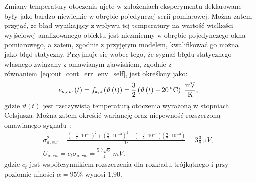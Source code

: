 Zmiany temperatury otoczenia ujęte w założeniach eksperymentu deklarowane były jako bardzo niewielkie w obrębie pojedynczej serii pomiarowej. Można zatem przyjąć, że błąd wynikający z wpływu tej temperatury na wartość wielkości wyjściowej analizowanego obiektu jest niezmienny w obrębie pojedynczego okna pomiarowego, a zatem, zgodnie z przyjętym modelem, kwalifikować go można jako błąd statyczny. Przyjmuje się wobec tego, że sygnał błędu statycznego własnego związany z omawianym zjawiskiem, zgodnie z równaniem~\eqref{eq:out_cont_err_env_self}, jest określony jako:
\begin{equation}
e_{a,sw} \emb{t} = f_{a,z} \left( \vartheta \emb{t} \right) = \frac{3}{2} \left( \vartheta \emb{t} - \qty{20}{\degreeCelsius} \right)~\unit{\frac{mV}{K}} \label{eq:sym_parta_stat_err},
\end{equation}
gdzie $\vartheta(t)$ jest rzeczywistą temperaturą otoczenia wyrażoną w stopniach Celsjusza. Można zatem określić wariancję oraz niepewność rozszerzoną omawianego sygnału~\cite{jcgm_guide}:
\begin{gather}
\sigma_{a,sw}^{2} = \frac{\left( -\frac{9}{2} \cdot 10^{-3} \right)^{2} + \left( \frac{9}{2} \cdot 10^{-3} \right)^{2} - \left( -\frac{9}{2} \cdot 10^{-3} \right) \left( \frac{9}{2} \cdot 10^{-3} \right)}{18} = 3 \frac{3}{8}~\unit{\micro V} \label{eq:sym_parta_stat_var}, \\
U_{a,sw} = c_{t} \sigma_{a,rw} = \frac{5.7 \sqrt{6}}{4}~\unit{mV} \label{eq:sym_parta_stat_unc},
\end{gather}
gdzie $c_{t}$ jest współczynnikiem rozszerzenia dla rozkładu trójkątnego i przy poziomie ufności $\alpha = 95\%$ wynosi $1.90$.

